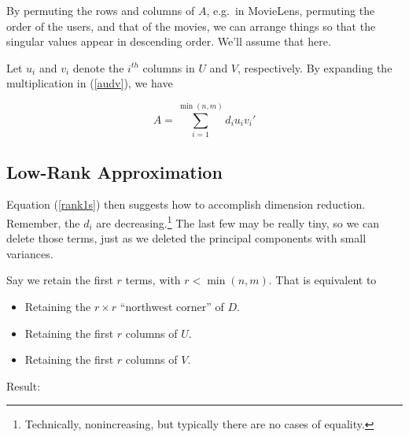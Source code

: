 By permuting the rows and columns of $A$, e.g.\ in MovieLens, permuting
the order of the users, and that of the movies, we can arrange things so
that the singular values appear in descending order.  We'll assume that
here.

Let $u_i$ and $v_i$ denote the $i^{th}$ columns in $U$ and $V$, 
respectively.  By expanding the multiplication in (\ref{audv}), we have

\begin{equation}
\label{rank1s}
A = \sum_{i=1}^{\min(n,m)} d_i  u_i v_i'
\end{equation}

% 

\subsection{Low-Rank Approximation}

Equation (\ref{rank1s}) then suggests how to accomplish dimension
reduction.  Remember, the $d_i$ are decreasing.\footnote{Technically,
nonincreasing, but typically there are no cases of equality.}  The last
few may be really tiny, so we can delete those terms, just as we
deleted the principal components with small variances.

Say we retain the first $r$ terms, with $r < \min(n,m)$.  That is
equivalent to

\begin{itemize}

\item Retaining the $r \times r$ ``northwest corner'' of $D$.

\item Retaining the first $r$ columns of $U$.

\item Retaining the first $r$ columns of $V$.

\end{itemize} 

Result:

